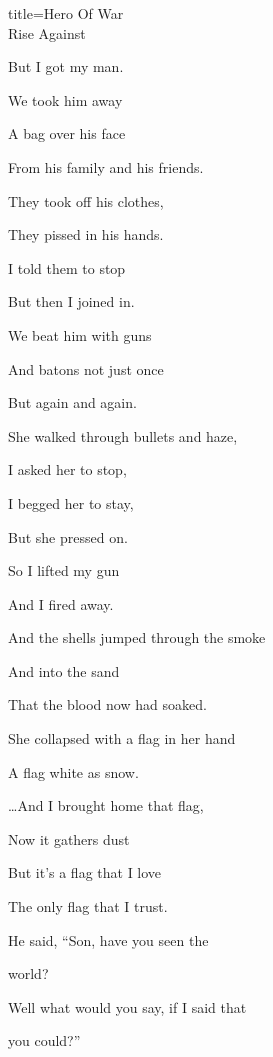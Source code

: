 \begin{song}{title=\predtitle\centering Hero Of War\\\large Rise Against \vspace*{-0.3cm}}
\begin{centerjustified}
\begin{varwidth}[t]{0.48\textwidth}
But I got my man.

We took him away

A bag over his face

From his family and his friends.

\sloka
They took off his clothes,

They pissed in his hands.

I told them to stop

But then I joined in.

We beat him with guns

And batons not just once

But again and again.


\sloka
She walked through bullets and haze,

I asked her to stop,

I begged her to stay,

But she pressed on.

So I lifted my gun

And I fired away.

\sloka
And the shells jumped through the smoke

And into the sand

That the blood now had soaked.

She collapsed with a flag in her hand

A flag white as snow.


\dots And I brought home that flag,

Now it gathers dust

But it's a flag that I love

The only flag that I trust.


He said, ``Son, have you seen the

world?

Well what would you say, if I said that

you could?''

\end{varwidth}

\end{centerjustified}
\setcounter{Slokočet}{0}
\end{song}
